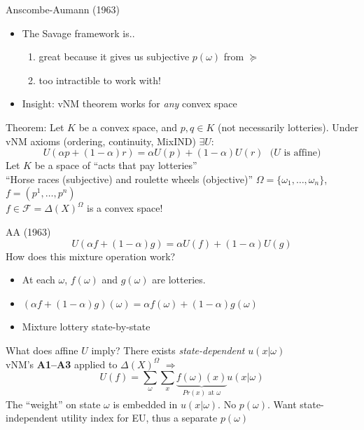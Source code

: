 \begin{frame}{Anscombe-Aumann (1963)}
    \begin{itemize}
        \item The Savage framework is..
        \begin{enumerate}
            \item great because it gives us subjective $p(\omega)$ from $\succeq$
            \item too intractible to work with!
        \end{enumerate}
        \item Insight: vNM theorem works for \textit{any} convex space
    \end{itemize}
Theorem: Let $K$ be a convex space, and $p,q\in K$ (not necessarily lotteries). Under vNM axioms (ordering, continuity, MixIND) $\exists U$:
$$
    U(\alpha p + (1-\alpha)r) = \alpha U(p) + (1-\alpha) U(r)\ \ \ \text{(}U\text{ is affine)}
$$
\br
Let $K$ be a space of ``acts that pay lotteries''\\
``Horse races (subjective) and roulette wheels (objective)''
\br
$\Omega = \{\omega_1,\ldots,\omega_n\}$, $f=(p^1,\ldots,p^n)$\\
$f\in \mathcal{F} = \Delta(X)^\Omega$ is a convex space!
\end{frame}

\begin{frame}{AA (1963)}
$$
U(\alpha f + (1-\alpha)g) = \alpha U(f) + (1-\alpha) U(g)
$$
How does this mixture operation work?
\begin{itemize}
    \item At each $\omega$, $f(\omega)$ and $g(\omega)$ are lotteries.
    \item $(\alpha f+ (1-\alpha)g)(\omega) = \alpha f(\omega) + (1-\alpha) g(\omega)$
    \item Mixture lottery state-by-state
\end{itemize}
What does affine $U$ imply? There exists \textit{state-dependent} $u(x|\omega)$\\
vNM's \textbf{A1--A3} applied to $\Delta(X)^\Omega$ $\Rightarrow$
$$
    U(f) = \sum_\omega \sum_x \underbrace{f(\omega)(x)}_{Pr(x)\text{ at }\omega} u(x|\omega)
$$
The ``weight'' on state $\omega$ is embedded in $u(x|\omega)$. No $p(\omega)$.
\br
Want state-independent utility index for EU, thus a separate $p(\omega)$
\end{frame}

